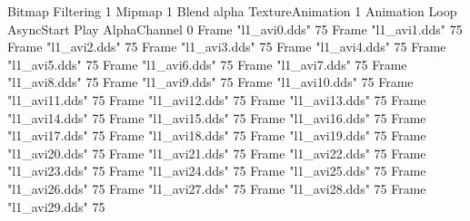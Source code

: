 {Bitmap
  {Filtering 1}
  {Mipmap 1}
  {Blend alpha}
  {TextureAnimation 1}
  {Animation Loop AsyncStart Play}
  {AlphaChannel 0}
  {Frame "l1_avi0.dds" 75}
  {Frame "l1_avi1.dds" 75}
  {Frame "l1_avi2.dds" 75}
  {Frame "l1_avi3.dds" 75}
  {Frame "l1_avi4.dds" 75}
  {Frame "l1_avi5.dds" 75}
  {Frame "l1_avi6.dds" 75}
  {Frame "l1_avi7.dds" 75}
  {Frame "l1_avi8.dds" 75}
  {Frame "l1_avi9.dds" 75}
  {Frame "l1_avi10.dds" 75}
  {Frame "l1_avi11.dds" 75}
  {Frame "l1_avi12.dds" 75}
  {Frame "l1_avi13.dds" 75}
  {Frame "l1_avi14.dds" 75}
  {Frame "l1_avi15.dds" 75}
  {Frame "l1_avi16.dds" 75}
  {Frame "l1_avi17.dds" 75}
  {Frame "l1_avi18.dds" 75}
  {Frame "l1_avi19.dds" 75}
  {Frame "l1_avi20.dds" 75}
  {Frame "l1_avi21.dds" 75}
  {Frame "l1_avi22.dds" 75}
  {Frame "l1_avi23.dds" 75}
  {Frame "l1_avi24.dds" 75}
  {Frame "l1_avi25.dds" 75}
  {Frame "l1_avi26.dds" 75}
  {Frame "l1_avi27.dds" 75}
  {Frame "l1_avi28.dds" 75}
  {Frame "l1_avi29.dds" 75}
}
